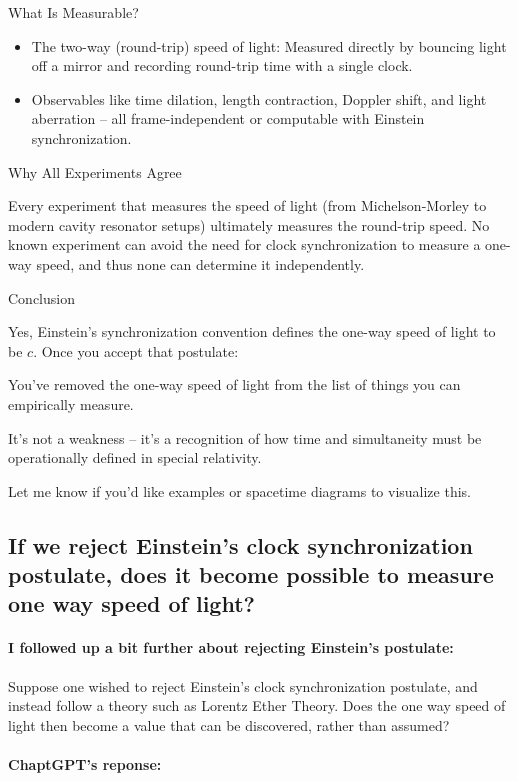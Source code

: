 \documentclass[a4paper]{article}
\theoremstyle{plain}
\theoremstyle{definition}
\begin{document}
What Is Measurable?
\begin{itemize}
\item The two-way (round-trip) speed of light: Measured directly by
  bouncing light off a mirror and recording round-trip time with a
  single clock.
\item Observables like time dilation, length contraction, Doppler
  shift, and light aberration -- all frame-independent or computable
  with Einstein synchronization.
\end{itemize}

Why All Experiments Agree

Every experiment that measures the speed of light (from
Michelson-Morley to modern cavity resonator setups) ultimately
measures the round-trip speed.  No known experiment can avoid the need
for clock synchronization to measure a one-way speed, and thus none
can determine it independently.

Conclusion

Yes, Einstein's synchronization convention defines the one-way speed
of light to be $c$.  Once you accept that postulate:

You've removed the one-way speed of light from the list of things you
can empirically measure.

It's not a weakness -- it's a recognition of how time and simultaneity
must be operationally defined in special relativity.

Let me know if you'd like examples or spacetime diagrams to visualize
this.


\subsection{If we reject Einstein's clock synchronization postulate, does it become possible to measure one way speed of light?}

\paragraph{I followed up a bit further about rejecting Einstein's postulate:}

Suppose one wished to reject Einstein's clock synchronization
postulate, and instead follow a theory such as Lorentz Ether Theory.
Does the one way speed of light then become a value that can be
discovered, rather than assumed?

\paragraph{ChaptGPT's reponse:}
\end{document}
